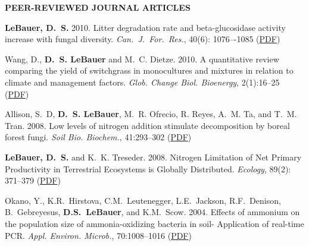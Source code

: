 \documentclass[10pt,twoside]{article}
\begin{document}
\textbf{PEER-REVIEWED JOURNAL ARTICLES}
\begin{itemize*}





\item \noindent%
\textbf{LeBauer, D.~S.} 2010. Litter degradation rate and beta-glucosidase activity increase with fungal diversity. \textit{Can.\ J.\ For.\ Res.}, 40(6): 1076–-1085
\ifpdf %
(\href{https://netfiles.uiuc.edu/dlebauer/www/lebauer2010ldr.pdf}{PDF})
\fi %

\item \noindent%
Wang, D., \textbf{D.~S. LeBauer} and M.~C. Dietze. 2010. A quantitative review comparing the yield of
switchgrass in monocultures and mixtures in relation to climate and management factors. \textit{Glob.
Change Biol. Bioenergy}, 2(1):16--25
\ifpdf %
(\href{https://netfiles.uiuc.edu/dlebauer/www/wang2010qrc.pdf}{PDF})
\fi %

\item \noindent%
Allison, S.~D, \textbf{D.~S. LeBauer}, M.~R. Ofrecio, R. Reyes, A.~M. Ta, and T.~M. Tran. 2008. Low levels of
nitrogen addition stimulate decomposition by boreal forest fungi. \textit{Soil Bio. Biochem.}, 41:293--302
\ifpdf %
(\href{https://netfiles.uiuc.edu/dlebauer/www/allison2009qrc.pdf}{PDF})
\fi %

\item \noindent%
\textbf{LeBauer, D.~S.} and K.~K. Treseder. 2008. Nitrogen Limitation of Net Primary Productivity in
Terrestrial Ecosystems is Globally Distributed. \textit{Ecology}, 89(2): 371--379
\ifpdf %
(\href{https://://netfiles.uiuc.edu/dlebauer/www/lebauer2008nln.pdf}{PDF})
\fi %

\item \noindent%
Okano, Y., K.R.~Hirstova, C.M.~Leutenegger, L.E.~Jackson, R.F.~Denison, B.~Gebreyesus, \textbf{D.S.~LeBauer}, and K.M.~Scow. 2004. Effects of ammonium on the population size of ammonia-oxidizing bacteria in soil- Application of real-time PCR. \textit{Appl. Environ. Microb.}, 70:1008--1016
\ifpdf %
(\href{https://://netfiles.uiuc.edu/dlebauer/www/okano2004art.pdf}{PDF})
\fi %
\end{itemize*}
\end{document}
